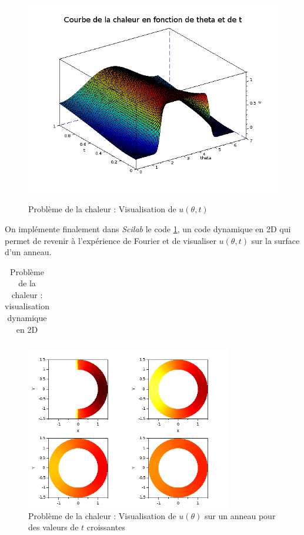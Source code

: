 \documentclass[a4paper,10pt]{report}
\begin{document}
\begin{figure}[H]
\centering
\caption{Problème de la chaleur : Visualisation de $u(\theta,t)$}
\includegraphics[width=13cm]{chaleur2.png}
\label{graph_chaleur2}
\end{figure}

\newpage
On implémente finalement dans \textit{Scilab} le code \ref{chaleur3}, un code dynamique en 2D qui permet de revenir à l'expérience de Fourier et de visualiser $u(\theta,t)$ sur la surface d'un anneau.
\begin{table}[H]
\caption{Problème de la chaleur : visualisation dynamique en 2D}
\begin{tabular}{l}

\label{chaleur3}
\end{tabular}
\end{table}

\begin{figure}[H]
\centering
\caption{Problème de la chaleur : Visualisation de $u(\theta)$ sur un anneau pour des valeurs de $t$ croissantes}
\includegraphics[width=9cm]{chaleur3.png}
\end{figure}
\end{document}
